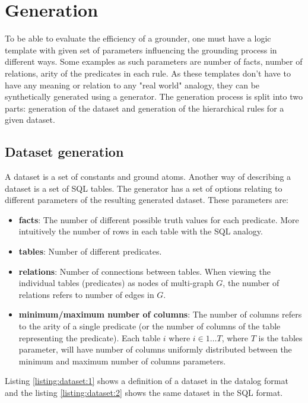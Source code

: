 \documentclass[12pt,oneside]{article}
\begin{document}
\section{Generation}
To be able to evaluate the efficiency of a grounder, one must have a logic template with given set
of parameters influencing the grounding process in different ways. Some examples as such parameters
are number of facts, number of relations, arity of the predicates in each rule. As these templates
don't have to have any meaning or relation to any "real world" analogy, they can be synthetically
generated using a generator. The generation process is split into two parts: generation of the
dataset and generation of the hierarchical rules for a given dataset.
\subsection{Dataset generation}
A dataset is a set of constants and ground atoms. Another way of describing a
dataset is a set of SQL tables. The generator has a set of options relating to
different parameters of the resulting generated dataset. These parameters are:

\begin{itemize}
    \item \textbf{facts}: The number of different possible truth values for each predicate. More intuitively the number of rows in each table with the SQL analogy.

    \item \textbf{tables}: Number of different predicates.

    \item \textbf{relations}: Number of connections between tables. When viewing the individual tables (predicates) as nodes of multi-graph $G$, the number of relations refers to number of edges in $G$.

    \item \textbf{minimum/maximum number of columns}: The number of columns refers to the arity of a single predicate (or the number of columns of the table representing the predicate). Each table $i$ where $i \in 1 \dots T$, where $T$ is the tables parameter, will have number of columns uniformly distributed between the minimum and maximum number of columns parameters.
\end{itemize}

Listing \ref{listing:dataset:1} shows a definition of a dataset in the datalog
format and the listing \ref{listing:dataset:2} shows the same dataset in the SQL format.
\end{document}
